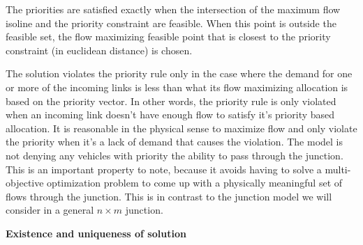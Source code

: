 \begin{remark}
The priorities are satisfied exactly when the intersection of the maximum flow isoline and the priority constraint are feasible. When this point is outside the feasible set, the flow maximizing feasible point that is closest to the priority constraint (in euclidean distance) is chosen.
\end{remark}

\begin{remark}
The solution violates the priority rule only in the case where the demand for one or more of the incoming links is less than what its flow maximizing allocation is based on the priority vector. In other words, the priority rule is only violated when an incoming link doesn't have enough flow to satisfy it's priority based allocation. It is reasonable in the physical sense to maximize flow and only violate the priority when it's a lack of demand that causes the violation. The model is not denying any vehicles with priority the ability to pass through the junction. This is an important property to note, because it avoids having to solve a multi-objective optimization problem to come up with a physically meaningful set of flows through the junction. This is in contrast to the junction model we will consider in a general $n\times m$ junction. 
\end{remark}

\textbf{Existence and uniqueness of solution}

